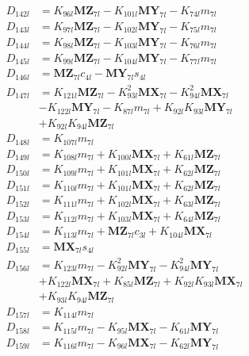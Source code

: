 \begin{multicols}{2}
\begin{align}
D_{142l} &= K_{96l}\mathbf{MZ}_{7l} - K_{101l}\mathbf{MY}_{7l} - K_{74l}m_{7l} \nonumber \\
D_{143l} &= K_{97l}\mathbf{MZ}_{7l} - K_{102l}\mathbf{MY}_{7l} - K_{75l}m_{7l} \nonumber \\
D_{144l} &= K_{98l}\mathbf{MZ}_{7l} - K_{103l}\mathbf{MY}_{7l} - K_{76l}m_{7l} \nonumber \\
D_{145l} &= K_{99l}\mathbf{MZ}_{7l} - K_{104l}\mathbf{MY}_{7l} - K_{77l}m_{7l} \nonumber \\
D_{146l} &= \mathbf{MZ}_{7l}c_{4l} - \mathbf{MY}_{7l}s_{4l} \nonumber \\
D_{147l} &= K_{121l}\mathbf{MZ}_{7l} - K_{93l}^2\mathbf{MX}_{7l} - K_{94l}^2\mathbf{MX}_{7l}  \nonumber \\
&- K_{122l}\mathbf{MY}_{7l} - K_{87l}m_{7l} + K_{92l}K_{93l}\mathbf{MY}_{7l}  \nonumber \\
&+ K_{92l}K_{94l}\mathbf{MZ}_{7l} \nonumber \\
D_{148l} &= K_{107l}m_{7l} \nonumber \\
D_{149l} &= K_{108l}m_{7l} + K_{100l}\mathbf{MX}_{7l} + K_{61l}\mathbf{MZ}_{7l} \nonumber \\
D_{150l} &= K_{109l}m_{7l} + K_{101l}\mathbf{MX}_{7l} + K_{62l}\mathbf{MZ}_{7l} \nonumber \\
D_{151l} &= K_{110l}m_{7l} + K_{101l}\mathbf{MX}_{7l} + K_{62l}\mathbf{MZ}_{7l} \nonumber \\
D_{152l} &= K_{111l}m_{7l} + K_{102l}\mathbf{MX}_{7l} + K_{63l}\mathbf{MZ}_{7l} \nonumber \\
D_{153l} &= K_{112l}m_{7l} + K_{103l}\mathbf{MX}_{7l} + K_{64l}\mathbf{MZ}_{7l} \nonumber \\
D_{154l} &= K_{113l}m_{7l} + \mathbf{MZ}_{7l}c_{3l} + K_{104l}\mathbf{MX}_{7l} \nonumber \\
D_{155l} &= \mathbf{MX}_{7l}s_{4l} \nonumber \\
D_{156l} &= K_{123l}m_{7l} - K_{92l}^2\mathbf{MY}_{7l} - K_{94l}^2\mathbf{MY}_{7l}  \nonumber \\
&+ K_{122l}\mathbf{MX}_{7l} + K_{85l}\mathbf{MZ}_{7l} + K_{92l}K_{93l}\mathbf{MX}_{7l}  \nonumber \\
&+ K_{93l}K_{94l}\mathbf{MZ}_{7l} \nonumber \\
D_{157l} &= K_{114l}m_{7l} \nonumber \\
D_{158l} &= K_{115l}m_{7l} - K_{95l}\mathbf{MX}_{7l} - K_{61l}\mathbf{MY}_{7l} \nonumber \\
D_{159l} &= K_{116l}m_{7l} - K_{96l}\mathbf{MX}_{7l} - K_{62l}\mathbf{MY}_{7l} \nonumber \\

\end{align}
\end{multicols}
